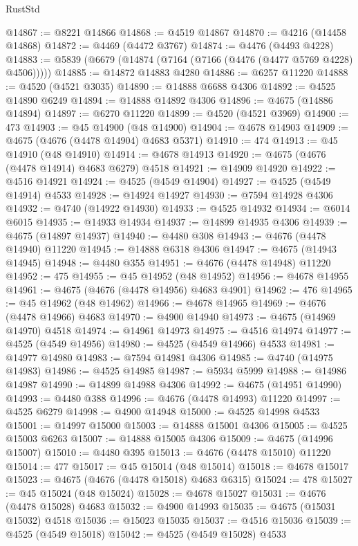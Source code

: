 \begin{lexlean}{RustStd}
\begin{coremodule}
@14867 := @8221 @14866
@14868 := @4519 @14867
@14870 := @4216 (@14458 @14868)
@14872 := @4469 (@4472 @3767)
@14874 := @4476 (@4493 @4228)
@14883 := @5839 (@6679 (@14874 (@7164 (@7166 (@4476 (@4477 @5769 @4228) @4506)))))
@14885 := @14872 @14883 @4280
@14886 := @6257 @11220
@14888 := @4520 (@4521 @3035)
@14890 := @14888 @6688 @4306
@14892 := @4525 @14890 @6249
@14894 := @14888 @14892 @4306
@14896 := @4675 (@14886 @14894)
@14897 := @6270 @11220
@14899 := @4520 (@4521 @3969)
@14900 := 473
@14903 := @45 @14900 (@48 @14900)
@14904 := @4678 @14903
@14909 := @4675 (@4676 (@4478 @14904) @4683 @5371)
@14910 := 474
@14913 := @45 @14910 (@48 @14910)
@14914 := @4678 @14913
@14920 := @4675 (@4676 (@4478 @14914) @4683 @6279) @4518
@14921 := @14909 @14920
@14922 := @4516 @14921
@14924 := @4525 (@4549 @14904)
@14927 := @4525 (@4549 @14914) @4533
@14928 := @14924 @14927
@14930 := @7594 @14928 @4306
@14932 := @4740 (@14922 @14930)
@14933 := @4525 @14932
@14934 := @6014 @6015
@14935 := @14933 @14934
@14937 := @14899 @14935 @4306
@14939 := @4675 (@14897 @14937)
@14940 := @4480 @308
@14943 := @4676 (@4478 @14940) @11220
@14945 := @14888 @6318 @4306
@14947 := @4675 (@14943 @14945)
@14948 := @4480 @355
@14951 := @4676 (@4478 @14948) @11220
@14952 := 475
@14955 := @45 @14952 (@48 @14952)
@14956 := @4678 @14955
@14961 := @4675 (@4676 (@4478 @14956) @4683 @4901)
@14962 := 476
@14965 := @45 @14962 (@48 @14962)
@14966 := @4678 @14965
@14969 := @4676 (@4478 @14966) @4683
@14970 := @4900 @14940
@14973 := @4675 (@14969 @14970) @4518
@14974 := @14961 @14973
@14975 := @4516 @14974
@14977 := @4525 (@4549 @14956)
@14980 := @4525 (@4549 @14966) @4533
@14981 := @14977 @14980
@14983 := @7594 @14981 @4306
@14985 := @4740 (@14975 @14983)
@14986 := @4525 @14985
@14987 := @5934 @5999
@14988 := @14986 @14987
@14990 := @14899 @14988 @4306
@14992 := @4675 (@14951 @14990)
@14993 := @4480 @388
@14996 := @4676 (@4478 @14993) @11220
@14997 := @4525 @6279
@14998 := @4900 @14948
@15000 := @4525 @14998 @4533
@15001 := @14997 @15000
@15003 := @14888 @15001 @4306
@15005 := @4525 @15003 @6263
@15007 := @14888 @15005 @4306
@15009 := @4675 (@14996 @15007)
@15010 := @4480 @395
@15013 := @4676 (@4478 @15010) @11220
@15014 := 477
@15017 := @45 @15014 (@48 @15014)
@15018 := @4678 @15017
@15023 := @4675 (@4676 (@4478 @15018) @4683 @6315)
@15024 := 478
@15027 := @45 @15024 (@48 @15024)
@15028 := @4678 @15027
@15031 := @4676 (@4478 @15028) @4683
@15032 := @4900 @14993
@15035 := @4675 (@15031 @15032) @4518
@15036 := @15023 @15035
@15037 := @4516 @15036
@15039 := @4525 (@4549 @15018)
@15042 := @4525 (@4549 @15028) @4533

\end{coremodule}
\end{lexlean}
